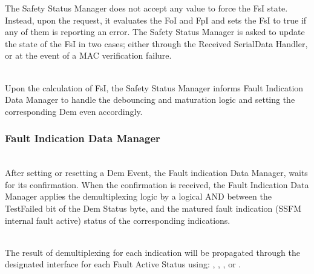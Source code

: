 The Safety Status Manager does not accept any value to force the FsI state. Instead, upon the request, it evaluates the FoI and FpI and sets the FsI to true if any of them is reporting an error.
The Safety Status Manager is asked to update the state of the FsI in two cases; either through the Received SerialData Handler, or at the event of a MAC verification failure. 

{  }

\\

Upon the calculation of FsI, the Safety Status Manager informs Fault Indication Data Manager 
to handle the debouncing and maturation logic and setting the corresponding Dem even accordingly.

{    }


\subsubsection{Fault Indication Data Manager}

\\
\label{sec:FaultIndicationDM}
After setting or resetting a Dem Event, the Fault indication Data Manager, waits for its confirmation. When the confirmation is received,
the Fault Indication Data Manager applies the demultiplexing logic by a logical AND between the TestFailed bit of the Dem Status byte,
and the matured fault indication (SSFM internal fault active) status of the corresponding indications. 
\\
{   }

\\
The result of demultiplexing for each indication will be propagated through the designated interface for each Fault Active Status using:
, , ,  or .
\\
{
        
       
     
}

